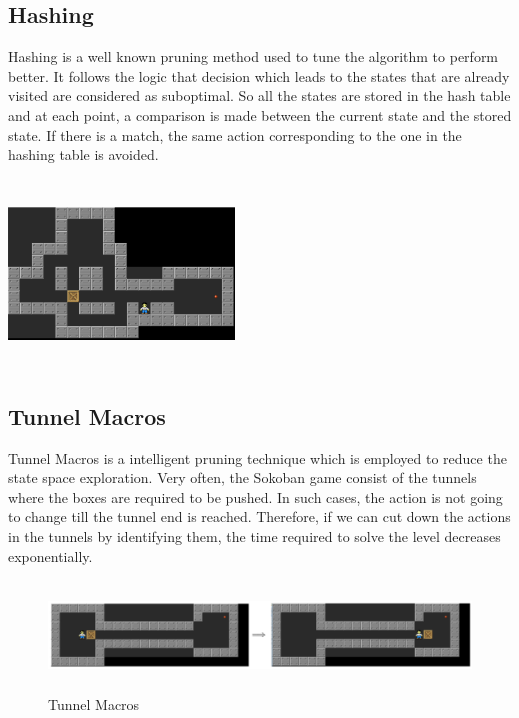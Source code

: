 \documentclass[10pt, final]{article}
\begin{document}
\begin{multicols}{2}
	\subsection{Hashing}
	Hashing is a well known pruning method used to tune the algorithm to perform better. It follows the logic that decision which leads to the states that are already visited are considered as suboptimal. So all the states are stored in the hash table and at each point, a comparison is made between the current state and the stored state. If there is a match, the same action corresponding to the one in the hashing table is avoided.
		\begin{center}
		\includegraphics[width=6cm, height=5cm]{pic1.png}
	\end{center}
	\subsection{Tunnel Macros}
	Tunnel Macros is a intelligent pruning technique which is employed to reduce the state space exploration. Very often, the Sokoban game consist of the tunnels where the boxes are required to be pushed. In such cases, the action is not going to change till the tunnel end is reached. Therefore, if we can cut down the actions in the tunnels by identifying them, the time required to solve the level decreases exponentially.  
		\begin{figure}
		\centering
				\includegraphics[height=1.15in]{tun.png}
		\caption{Tunnel Macros}
	\end{figure}

\end{multicols}
\end{document}
